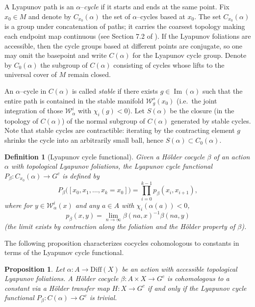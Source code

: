 \documentclass[11pt]{amsart}
\numberwithin{equation}{section}
\theoremstyle{plain}
\newtheorem{prop}[thm]{Proposition}
\newtheorem{defi}{Definition}[section]
\begin{document}
A Lyapunov path is an $\alpha$–\emph{cycle} if it starts and ends at the
same point. Fix $x_0\in M$ and denote by $C_{x_0}(\alpha)$ the set of
$\alpha$–cycles based at $x_0$. The set $C_{x_0}(\alpha)$ is a group
under concatenation of paths; it carries the coarsest topology making
each endpoint map continuous (see Section 7.2 of \cite{VinWang}). If
the Lyapunov foliations are accessible, then the cycle groups based at
different points are conjugate, so one may omit the basepoint and write
$C(\alpha)$ for the Lyapunov cycle group. Denote by $C_0(\alpha)$ the
subgroup of $C(\alpha)$ consisting of cycles whose lifts to the
universal cover of $M$ remain closed.

An $\alpha$–cycle in $C(\alpha)$ is called \emph{stable} if there exists
$g\in\operatorname{Im}(\alpha)$ such that the entire path is contained
in the stable manifold $\mathcal W^s_g(x_0)$ (i.e.\ the joint integration
of those $\mathcal W^i_\alpha$ with $\chi_i(g)<0$). Let $S(\alpha)$ be
the closure (in the topology of $C(\alpha)$) of the normal subgroup of
$C(\alpha)$ generated by stable cycles. Note that stable cycles are
contractible: iterating by the contracting element $g$ shrinks the
cycle into an arbitrarily small ball, hence $S(\alpha)\subset C_0(\alpha)$.

\begin{defi}[Lyapunov cycle functional]
Given a H\"older cocycle $\beta$ of an action $\alpha$ with topological
Lyapunov foliations, the \emph{Lyapunov cycle functional}
$P_\beta:C_{x_0}(\alpha)\to G^c$ is defined by
\[
P_\beta\big([x_0,x_1,\dots,x_k=x_0]\big)
=\prod_{i=0}^{k-1} p_\beta(x_i,x_{i+1}),
\]
where for $y\in\mathcal W^i_\alpha(x)$ and any $a\in A$ with
$\chi_i(\alpha(a))<0$,
\[
p_\beta(x,y)=\lim_{n\to\infty}\beta(na,x)^{-1}\beta(na,y)
\]
(the limit exists by contraction along the foliation and the H\"older
property of $\beta$).
\end{defi}

The following proposition characterizes cocycles cohomologous to
constants in terms of the Lyapunov cycle functional.

\begin{prop}\label{consttrivialfunctional}
Let $\alpha:A\to\mathrm{Diff}(X)$ be an action with accessible
topological Lyapunov foliations. A H\"older cocycle
$\beta:A\times X\to G^c$ is cohomologous to a constant via a
H\"older transfer map $H:X\to G^c$ if and only if the
Lyapunov cycle functional $P_\beta:C(\alpha)\to G^c$ is trivial.
\end{prop}
\end{document}
